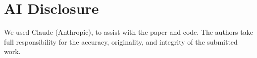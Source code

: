 \section*{AI Disclosure}
We used Claude (Anthropic), to assist with the paper and code. The
authors take full responsibility for the accuracy, originality, and
integrity of the submitted work.
